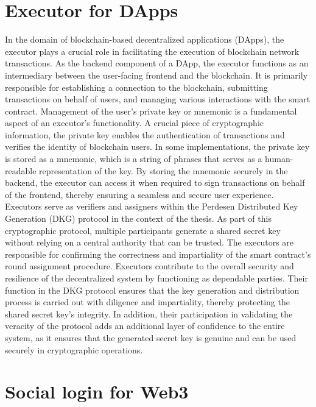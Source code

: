 \documentclass[../Main.tex]{subfiles}
\begin{document}
\section{Executor for DApps}
In the domain of blockchain-based decentralized applications (DApps), the executor plays a crucial role in facilitating the execution of blockchain network transactions. As the backend component of a DApp, the executor functions as an intermediary between the user-facing frontend and the blockchain. It is primarily responsible for establishing a connection to the blockchain, submitting transactions on behalf of users, and managing various interactions with the smart contract. Management of the user's private key or mnemonic is a fundamental aspect of an executor's functionality. A crucial piece of cryptographic information, the private key enables the authentication of transactions and verifies the identity of blockchain users. In some implementations, the private key is stored as a mnemonic, which is a string of phrases that serves as a human-readable representation of the key. By storing the mnemonic securely in the backend, the executor can access it when required to sign transactions on behalf of the frontend, thereby ensuring a seamless and secure user experience. Executors serve as verifiers and assigners within the Perdesen Distributed Key Generation (DKG) protocol in the context of the thesis. As part of this cryptographic protocol, multiple participants generate a shared secret key without relying on a central authority that can be trusted. The executors are responsible for confirming the correctness and impartiality of the smart contract's round assignment procedure. Executors contribute to the overall security and resilience of the decentralized system by functioning as dependable parties. Their function in the DKG protocol ensures that the key generation and distribution process is carried out with diligence and impartiality, thereby protecting the shared secret key's integrity. In addition, their participation in validating the veracity of the protocol adds an additional layer of confidence to the entire system, as it ensures that the generated secret key is genuine and can be used securely in cryptographic operations.

\section{Social login for Web3}
\end{document}
